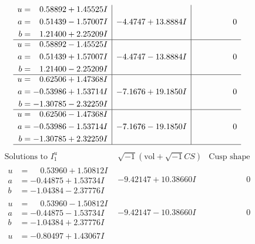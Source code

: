\documentclass[1p]{elsarticle_modified}
\theoremstyle{definition}
\newcommand{\I}{\sqrt{-1}}
\begin{document}
$$\begin{array}{c|c|c}
\begin{aligned}
u &= \phantom{-}0.58892 + 1.45525 I \\
a &= \phantom{-}0.51439 - 1.57007 I \\
b &= \phantom{-}1.21400 + 2.25209 I\end{aligned}
 & -4.4747 + 13.8884 I & \phantom{-0.000000 } 0 \\ \hline\begin{aligned}
u &= \phantom{-}0.58892 - 1.45525 I \\
a &= \phantom{-}0.51439 + 1.57007 I \\
b &= \phantom{-}1.21400 - 2.25209 I\end{aligned}
 & -4.4747 - 13.8884 I & \phantom{-0.000000 } 0 \\ \hline\begin{aligned}
u &= \phantom{-}0.62506 + 1.47368 I \\
a &= -0.53986 + 1.53714 I \\
b &= -1.30785 - 2.32259 I\end{aligned}
 & -7.1676 + 19.1850 I & \phantom{-0.000000 } 0 \\ \hline\begin{aligned}
u &= \phantom{-}0.62506 - 1.47368 I \\
a &= -0.53986 - 1.53714 I \\
b &= -1.30785 + 2.32259 I\end{aligned}
 & -7.1676 - 19.1850 I & \phantom{-0.000000 } 0\\
 \hline 
 \end{array}$$\newpage$$\begin{array}{c|c|c}  
\text{Solutions to }I^u_{1}& \I (\text{vol} + \sqrt{-1}CS) & \text{Cusp shape}\\
 \hline 
\begin{aligned}
u &= \phantom{-}0.53960 + 1.50812 I \\
a &= -0.44875 + 1.53734 I \\
b &= -1.04384 - 2.37776 I\end{aligned}
 & -9.42147 + 10.38660 I & \phantom{-0.000000 } 0 \\ \hline\begin{aligned}
u &= \phantom{-}0.53960 - 1.50812 I \\
a &= -0.44875 - 1.53734 I \\
b &= -1.04384 + 2.37776 I\end{aligned}
 & -9.42147 - 10.38660 I & \phantom{-0.000000 } 0 \\ \hline\begin{aligned}
u &= -0.80497 + 1.43067 I \\

\end{aligned}
\end{array}$$
\end{document}
